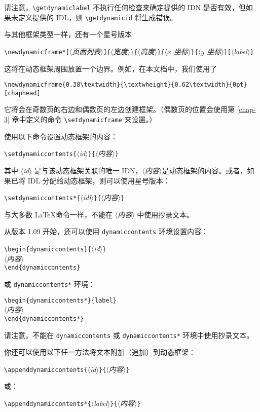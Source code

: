 \documentclass[a4paper]{book}%
\newcommand{\meta}[1]{\textnormal{\ensuremath{\langle}\makebox[0pt][l]{}\emph{#1}\makebox[0pt][l]{}\ensuremath{\rangle}}}
\newcommand{\cmd}[1]{\texttt{#1}}
\begin{document}
请注意，\verb|\getdynamiclabel| 不执行任何检查来确定提供的 IDN 是否有效，但如果未定义提供的 IDL，则 \verb|\getdynamicid| 将生成错误。

与其他框架类型一样，还有一个星号版本
\begin{mdframed}
\verb|\newdynamicframe*[|\meta{页面列表}\verb|]{|\meta{宽度}\verb|}{|\meta{高度}\verb|}{|\meta{$x$ 坐标}\verb|}{|\meta{$y$ 坐标}\verb|}[|\meta{label}\verb|]|
\end{mdframed}
这将在动态框架周围放置一个边界。例如，在本文档中，我们使用了
\begin{mdframed}
\verb|\newdynamicframe{0.38\textwidth}{\textwheight}{0.62\textwidth}{0pt}[chaphead]|
\end{mdframed}
它将会在奇数页的右边和偶数页的左边创建框架。（偶数页的位置会使用第 \ref{chap-3} 章中定义的命令 \verb|\setdynamicframe| 来设置。）

使用以下命令设置动态框架的内容：
\begin{mdframed}
\verb|\setdynamiccontents{|\meta{id}\verb|}{|\meta{内容}\verb|}|
\end{mdframed}
其中 \meta{id} 是与该动态框架关联的唯一 IDN，\meta{内容}是动态框架的内容。或者，如果已将 IDL 分配给动态框架，则可以使用星号版本：
\begin{mdframed}
\verb|\setdynamiccontents*{|\meta{idl}\verb|}{|\meta{内容}\verb|}|
\end{mdframed}
与大多数 \LaTeX 命令一样，不能在 \meta{内容} 中使用抄录文本。

从版本 1.09 开始，还可以使用 \cmd{dynamiccontents} 环境设置内容：
\begin{mdframed}
\verb|\begin{dynamiccontents}{|\meta{id}\verb|}|\\
\meta{内容}\\
\verb|\end{dynamiccontents}|
\end{mdframed}
或 \cmd{dynamiccontents*} 环境：
\begin{mdframed}
\verb|\begin{dynamiccontents*}{label}|\\
\meta{内容}\\
\verb|\end{dynamiccontents*}|
\end{mdframed}
请注意，不能在 \cmd{dynamiccontents} 或 \cmd{dynamiccontents*} 环境中使用抄录文本。\label{page-verbtext}

你还可以使用以下任一方法将文本附加（追加）到动态框架：
\begin{mdframed}
\verb|\appenddynamiccontents{|\meta{id}\verb|}{|\meta{内容}\verb|}|
\end{mdframed}
或：
\begin{mdframed}
\verb|\appenddynamiccontents*{|\meta{label}\verb|}{|\meta{内容}\verb|}|
\end{mdframed}
\end{document}
